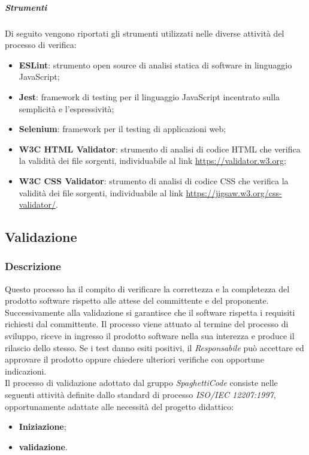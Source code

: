 \subparagraph{Strumenti}
\label{ssub:verifica:strumenti}

Di seguito vengono riportati gli strumenti utilizzati nelle diverse attività del processo di verifica:
\begin{itemize}
	\item \textbf{ESLint}: strumento open source di analisi statica di software in linguaggio JavaScript;
	\item \textbf{Jest}: framework di testing per il linguaggio JavaScript incentrato sulla semplicità e l'espressività;
	\item \textbf{Selenium}: framework per il testing di applicazioni web;
	\item \textbf{W3C HTML Validator}: strumento di analisi di codice HTML che verifica la validità dei file sorgenti, individuabile al
		link \url{https://validator.w3.org};
	\item \textbf{W3C CSS Validator}: strumento di analisi di codice CSS che verifica la validità dei file sorgenti, individuabile al
		link \url{https://jigsaw.w3.org/css-validator/}.
\end{itemize}

\subsection{Validazione}
\label{sub:validazione}

\subsubsection{Descrizione}
Questo processo ha il compito di verificare la correttezza e la completezza del prodotto software rispetto alle attese del committente e
del proponente. Successivamente alla validazione si garantisce che il software rispetta i requisiti richiesti dal committente.
Il processo viene attuato al termine del processo di sviluppo, riceve in ingresso il prodotto software nella sua interezza
e produce il rilascio dello stesso. Se i test danno esiti positivi, il \emph{Responsabile} può accettare ed approvare il prodotto oppure chiedere ulteriori verifiche con opportune indicazioni.\\

Il processo di validazione adottato dal gruppo \emph{SpaghettiCode} consiste nelle seguenti attività definite dallo standard di processo \emph{ISO/IEC 12207:1997}, opportunamente adattate alle necessità del progetto didattico:
\begin{itemize}
	\item \textbf{Iniziazione};
	\item \textbf{validazione}.
\end{itemize}

